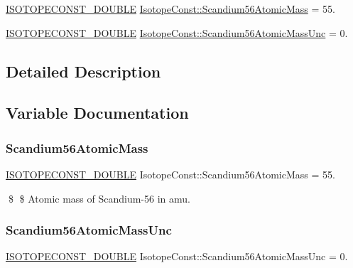 \begin{DoxyCompactItemize}
\item 
\mbox{\hyperlink{group___isotope_const-_macros_ga8f45a7272ce02c0b4c65c44636ed719a}{I\+S\+O\+T\+O\+P\+E\+C\+O\+N\+S\+T\+\_\+\+D\+O\+U\+B\+LE}} \mbox{\hyperlink{group___isotope_const-_scandium-_sc56_gaae9fb5828a58842eeb9dd666620b5c33}{Isotope\+Const\+::\+Scandium56\+Atomic\+Mass}} = 55.
\item 
\mbox{\hyperlink{group___isotope_const-_macros_ga8f45a7272ce02c0b4c65c44636ed719a}{I\+S\+O\+T\+O\+P\+E\+C\+O\+N\+S\+T\+\_\+\+D\+O\+U\+B\+LE}} \mbox{\hyperlink{group___isotope_const-_scandium-_sc56_gad25b2029baa1a33fe62bd0368cafffe8}{Isotope\+Const\+::\+Scandium56\+Atomic\+Mass\+Unc}} = 0.
\end{DoxyCompactItemize}


\subsection{Detailed Description}


\subsection{Variable Documentation}
\mbox{\label{group___isotope_const-_scandium-_sc56_gaae9fb5828a58842eeb9dd666620b5c33}} 
\subsubsection{\texorpdfstring{Scandium56\+Atomic\+Mass}{Scandium56AtomicMass}}
{\footnotesize\ttfamily \mbox{\hyperlink{group___isotope_const-_macros_ga8f45a7272ce02c0b4c65c44636ed719a}{I\+S\+O\+T\+O\+P\+E\+C\+O\+N\+S\+T\+\_\+\+D\+O\+U\+B\+LE}} Isotope\+Const\+::\+Scandium56\+Atomic\+Mass = 55.}

\$ \$ Atomic mass of Scandium-\/56 in amu. \mbox{\label{group___isotope_const-_scandium-_sc56_gad25b2029baa1a33fe62bd0368cafffe8}} 
\subsubsection{\texorpdfstring{Scandium56\+Atomic\+Mass\+Unc}{Scandium56AtomicMassUnc}}
{\footnotesize\ttfamily \mbox{\hyperlink{group___isotope_const-_macros_ga8f45a7272ce02c0b4c65c44636ed719a}{I\+S\+O\+T\+O\+P\+E\+C\+O\+N\+S\+T\+\_\+\+D\+O\+U\+B\+LE}} Isotope\+Const\+::\+Scandium56\+Atomic\+Mass\+Unc = 0.}

